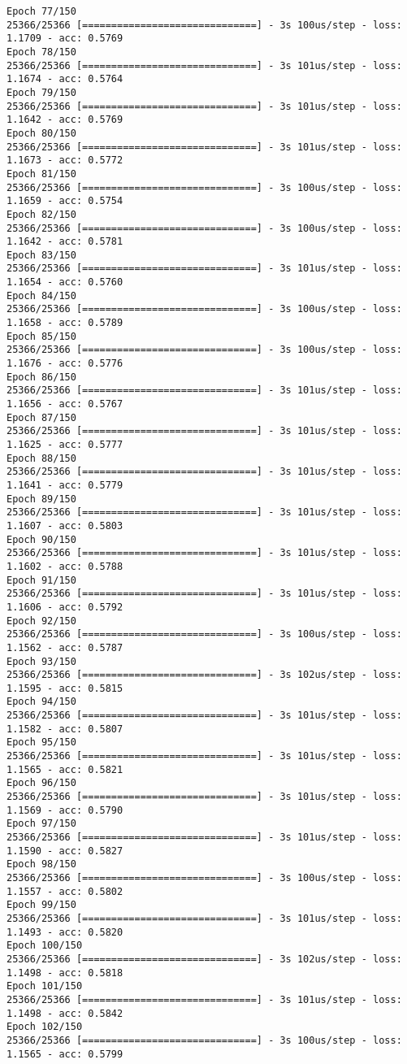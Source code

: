 \documentclass[11pt]{article}
\begin{document}
\begin{Verbatim}[commandchars=\\\{\}]
Epoch 77/150
25366/25366 [==============================] - 3s 100us/step - loss: 1.1709 - acc: 0.5769
Epoch 78/150
25366/25366 [==============================] - 3s 101us/step - loss: 1.1674 - acc: 0.5764
Epoch 79/150
25366/25366 [==============================] - 3s 101us/step - loss: 1.1642 - acc: 0.5769
Epoch 80/150
25366/25366 [==============================] - 3s 101us/step - loss: 1.1673 - acc: 0.5772
Epoch 81/150
25366/25366 [==============================] - 3s 100us/step - loss: 1.1659 - acc: 0.5754
Epoch 82/150
25366/25366 [==============================] - 3s 100us/step - loss: 1.1642 - acc: 0.5781
Epoch 83/150
25366/25366 [==============================] - 3s 101us/step - loss: 1.1654 - acc: 0.5760
Epoch 84/150
25366/25366 [==============================] - 3s 100us/step - loss: 1.1658 - acc: 0.5789
Epoch 85/150
25366/25366 [==============================] - 3s 100us/step - loss: 1.1676 - acc: 0.5776
Epoch 86/150
25366/25366 [==============================] - 3s 101us/step - loss: 1.1656 - acc: 0.5767
Epoch 87/150
25366/25366 [==============================] - 3s 101us/step - loss: 1.1625 - acc: 0.5777
Epoch 88/150
25366/25366 [==============================] - 3s 101us/step - loss: 1.1641 - acc: 0.5779
Epoch 89/150
25366/25366 [==============================] - 3s 101us/step - loss: 1.1607 - acc: 0.5803
Epoch 90/150
25366/25366 [==============================] - 3s 101us/step - loss: 1.1602 - acc: 0.5788
Epoch 91/150
25366/25366 [==============================] - 3s 101us/step - loss: 1.1606 - acc: 0.5792
Epoch 92/150
25366/25366 [==============================] - 3s 100us/step - loss: 1.1562 - acc: 0.5787
Epoch 93/150
25366/25366 [==============================] - 3s 102us/step - loss: 1.1595 - acc: 0.5815
Epoch 94/150
25366/25366 [==============================] - 3s 101us/step - loss: 1.1582 - acc: 0.5807
Epoch 95/150
25366/25366 [==============================] - 3s 101us/step - loss: 1.1565 - acc: 0.5821
Epoch 96/150
25366/25366 [==============================] - 3s 101us/step - loss: 1.1569 - acc: 0.5790
Epoch 97/150
25366/25366 [==============================] - 3s 101us/step - loss: 1.1590 - acc: 0.5827
Epoch 98/150
25366/25366 [==============================] - 3s 100us/step - loss: 1.1557 - acc: 0.5802
Epoch 99/150
25366/25366 [==============================] - 3s 101us/step - loss: 1.1493 - acc: 0.5820
Epoch 100/150
25366/25366 [==============================] - 3s 102us/step - loss: 1.1498 - acc: 0.5818
Epoch 101/150
25366/25366 [==============================] - 3s 101us/step - loss: 1.1498 - acc: 0.5842
Epoch 102/150
25366/25366 [==============================] - 3s 100us/step - loss: 1.1565 - acc: 0.5799

\end{Verbatim}
\end{document}
